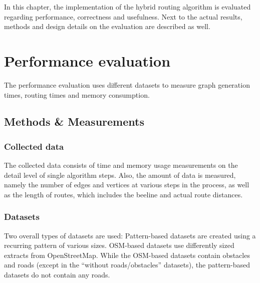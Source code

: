 
In this chapter, the implementation of the hybrid routing algorithm is evaluated regarding performance, correctness and usefulness.
Next to the actual results, methods and design details on the evaluation are described as well.

\section{Performance evaluation}

	The performance evaluation uses different datasets to measure graph generation times, routing times and memory consumption.

	\subsection{Methods \& Measurements}

		\subsubsection{Collected data}
		
			The collected data consists of time and memory usage measurements on the detail level of single algorithm steps.
			Also, the amount of data is measured, namely the number of edges and vertices at various steps in the process, as well as the length of routes, which includes the beeline and actual route distances.
		
		\subsubsection{Datasets}
		\label{subsubsec:eval-datasets}
		
			Two overall types of datasets are used:
			Pattern-based datasets are created using a recurring pattern of various sizes.
			OSM-based datasets use differently sized extracts from OpenStreetMap.
			While the OSM-based datasets contain obstacles and roads (except in the \enquote{without roads/obstacles} datasets), the pattern-based datasets do not contain any roads.
			
